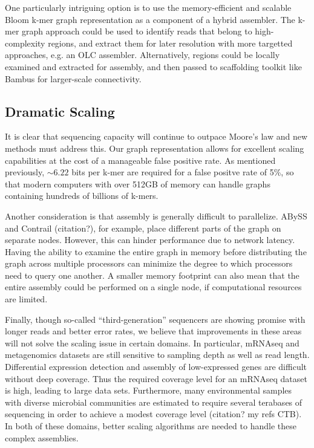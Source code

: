 \documentclass[12pt]{article} \usepackage{simplemargins}
\begin{document}
One particularly intriguing option is to use the memory-efficient and
scalable Bloom k-mer graph representation as a component of a hybrid
assembler.  The k-mer graph approach could be used to identify
reads that belong to high-complexity regions, and extract them for
later resolution with more targetted approaches, e.g. an OLC assembler.
Alternatively, regions could be locally examined and extracted for
assembly, and then passed to scaffolding toolkit like Bambus for 
larger-scale connectivity\cite{bambus}.

\subsection{Dramatic Scaling}
It is clear that sequencing capacity will continue to outpace Moore's 
law and new methods must address this. Our graph representation allows 
for excellent scaling capabilities at the cost of a manageable false positive rate. 
As mentioned previously, $\sim 6.22$ bits per k-mer are required for a 
false positve rate of 5\%, so that modern computers with 
over 512GB of memory can handle graphs containing hundreds of billions of k-mers.

Another consideration is that assembly is generally difficult to parallelize. 
ABySS and Contrail (citation?), for example, place different parts of the 
graph on separate nodes. However, this can hinder performance due to 
network latency. Having the ability to examine the entire graph in memory 
before distributing the graph across multiple processors can minimize the
degree to which processors need to query one another. A smaller memory 
footprint can also mean that the entire assembly could be performed on 
a single node, if computational resources are limited.

Finally, though so-called ``third-generation'' sequencers are showing promise with 
longer reads and better error rates, we believe that improvements in these 
areas will not solve the scaling issue in certain domains. In particular, 
mRNAseq and metagenomics datasets are still sensitive to sampling depth as
well as read length. Differential expression detection and assembly 
of low-expressed genes are difficult without deep coverage. Thus
the required coverage level for an mRNAseq dataset is high, leading to large
data sets. Furthermore, many environmental samples with 
diverse microbial communities are estimated to require several terabases of sequencing 
in order to achieve a modest coverage level (citation?  my refs CTB). In both of these domains, better 
scaling algorithms are needed to handle these complex assemblies. 
\end{document}
